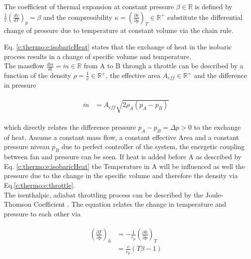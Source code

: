 The coefficient of thermal expansion at constant pressure $\beta \in \mathbb{R}$ is defined by $\frac{1}{v}\left( \frac{dv}{dT} \right)_p = \beta$ and the compressibility $\kappa = \left( \frac{\partial v}{\partial p} \right)_T \in \mathbb{R}^+$ substitute the differential change of pressure due to temperature at constant volume via the chain rule.\newline

Eq. \ref{c:thermo:e:isobaricHeat} states that the exchange of heat in the isobaric process results in a change of specific volume and temperature. \\

The massflow $\frac{dm}{dt} = \dot{m} \in \mathbb{R}$ from A to B through a throttle can be described by a function of the density $\rho = \frac{1}{v} \in \mathbb{R}^+$, the effective area $A_{eff} \in \mathbb{R}^+$ and the difference in pressure 

\begin{align}
\begin{split}
\dot{m} & = A_{eff} \sqrt{2 \rho_A  \left( p_A -p_B \right) }
\end{split}
\label{c:thermo:e:throttle}
\end{align}

which directly relates the difference pressure $p_A - p_B = \Delta p > 0$ to the exchange of heat. Assume a constant mass flow, a constant effective Area and a constant pressure niveau $p_B$ due to perfect controller of the system, the energetic coupling between fan and pressure can be seen. If heat is added before A as described by Eq. \ref{c:thermo:e:isobaricHeat} the Temperature in A will be influenced as well the pressure due to the change in the specific volume and therefore the density via Eq.\ref{c:thermo:e:throttle}.\\

The isenthalpic, adiabat throttling process can be described by the Joule-Thomson Coefficient \cite[p.387]{Struchtrup2014}. The equation relates the change in temperature and pressure to each other via

\begin{align}
\begin{split}
\left( \frac{\partial T}{\partial p}\right)_h &= -\frac{1}{c_p} \left(\frac{\partial h}{ \partial p} \right)_T \\
&= \frac{v}{c_p}\left( T\beta - 1 \right) 
\end{split}
\label{c:thermo:e:joulethomson}
\end{align}

